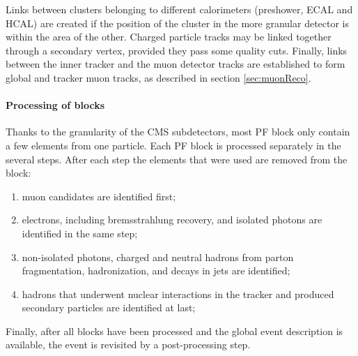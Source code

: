 Links between clusters belonging to different calorimeters (preshower, ECAL and HCAL) are created if the position of the cluster in the more granular detector is within the area of the other.
Charged particle tracks may be linked together through a secondary vertex, provided they pass some quality cuts.
Finally, links between the inner tracker and the muon detector tracks are established to form global and tracker muon tracks, as described in section \ref{sec:muonReco}.

\paragraph{Processing of blocks\\}

Thanks to the granularity of the CMS subdetectors, most PF block only contain a few elements from one particle.
Each PF block is processed separately in the several steps. After each step the elements that were used are removed from the block:
\begin{enumerate}
\item muon candidates are identified first;
\item electrons, including bremsstrahlung recovery, and isolated photons are identified in the same step;
\item non-isolated photons, charged and neutral hadrons from parton fragmentation, hadronization, and decays in jets are identified;
\item hadrons that underwent nuclear interactions in the tracker and produced secondary particles are identified at last;
\end{enumerate}
Finally, after all blocks have been processed and the global event description is available, the event is revisited by a post-processing step.
